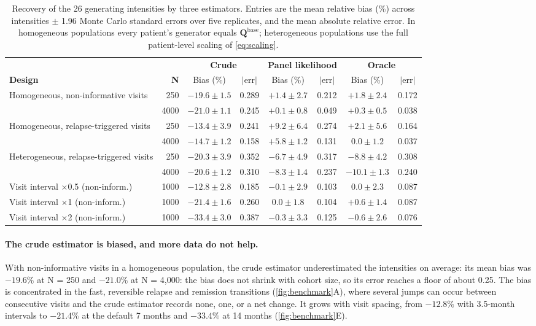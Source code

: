 \documentclass[11pt,a4paper]{article}
\newcommand{\Q}{\mathbf{Q}}
\begin{document}
\begin{table}[htbp]
\centering
\caption{Recovery of the 26 generating intensities by three estimators. Entries are the mean relative bias (\%) across intensities $\pm$ 1.96 Monte Carlo standard errors over five replicates, and the mean absolute relative error. In homogeneous populations every patient's generator equals $\Q^{\mathrm{base}}$; heterogeneous populations use the full patient-level scaling of \cref{eq:scaling}.}
\label{tab:benchmark}
\small
\begin{tabular}{p{4.6cm}rcccccc}
\toprule
& & \multicolumn{2}{c}{\textbf{Crude}} & \multicolumn{2}{c}{\textbf{Panel likelihood}} & \multicolumn{2}{c}{\textbf{Oracle}}\\
\cmidrule(lr){3-4}\cmidrule(lr){5-6}\cmidrule(lr){7-8}
\textbf{Design} & \textbf{N} & Bias (\%) & $|$err$|$ & Bias (\%) & $|$err$|$ & Bias (\%) & $|$err$|$\\
\midrule
Homogeneous, non-informative visits & 250 & $-19.6\pm1.5$ & 0.289 & $+1.4\pm2.7$ & 0.212 & $+1.8\pm2.4$ & 0.172 \\
 & 4000 & $-21.0\pm1.1$ & 0.245 & $+0.1\pm0.8$ & 0.049 & $+0.3\pm0.5$ & 0.038 \\
\addlinespace
Homogeneous, relapse-triggered visits & 250 & $-13.4\pm3.9$ & 0.241 & $+9.2\pm6.4$ & 0.274 & $+2.1\pm5.6$ & 0.164 \\
 & 4000 & $-14.7\pm1.2$ & 0.158 & $+5.8\pm1.2$ & 0.131 & $0.0\pm1.2$ & 0.037 \\
\addlinespace
Heterogeneous, relapse-triggered visits & 250 & $-20.3\pm3.9$ & 0.352 & $-6.7\pm4.9$ & 0.317 & $-8.8\pm4.2$ & 0.308 \\
 & 4000 & $-20.6\pm1.2$ & 0.310 & $-8.3\pm1.4$ & 0.237 & $-10.1\pm1.3$ & 0.240 \\
\addlinespace
Visit interval $\times$0.5 (non-inform.) & 1000 & $-12.8\pm2.8$ & 0.185 & $-0.1\pm2.9$ & 0.103 & $0.0\pm2.3$ & 0.087 \\
Visit interval $\times$1 (non-inform.) & 1000 & $-21.4\pm1.6$ & 0.260 & $0.0\pm1.8$ & 0.104 & $+0.6\pm1.4$ & 0.087 \\
Visit interval $\times$2 (non-inform.) & 1000 & $-33.4\pm3.0$ & 0.387 & $-0.3\pm3.3$ & 0.125 & $-0.6\pm2.6$ & 0.076 \\
\bottomrule
\end{tabular}
\end{table}

\paragraph{The crude estimator is biased, and more data do not help.}
With non-informative visits in a homogeneous population, the crude estimator underestimated the intensities on average: its mean bias was $-19.6\%$ at N = 250 and $-21.0\%$ at N = 4,000: the bias does not shrink with cohort size, so its error reaches a floor of about 0.25. The bias is concentrated in the fast, reversible relapse and remission transitions (\cref{fig:benchmark}A), where several jumps can occur between consecutive visits and the crude estimator records none, one, or a net change. It grows with visit spacing, from $-12.8\%$ with 3.5-month intervals to $-21.4\%$ at the default 7 months and $-33.4\%$ at 14 months (\cref{fig:benchmark}E).
\end{document}
